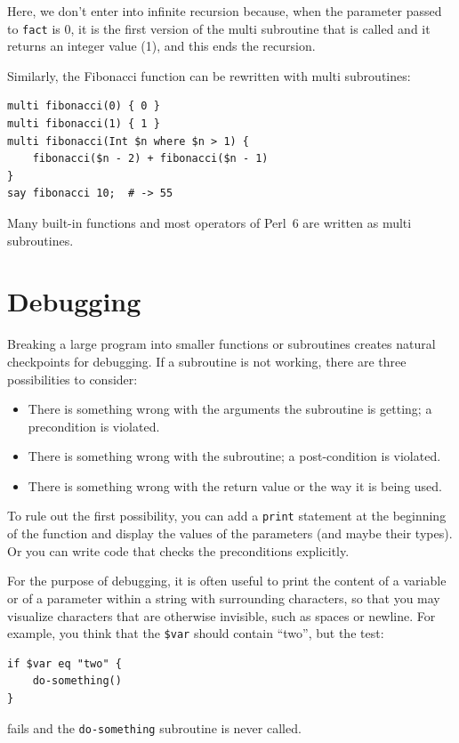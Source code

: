 Here, we don't enter into infinite recursion because, when 
the parameter passed to {\tt fact} is 0, it is the first 
version of the multi subroutine that is called and it returns 
an integer value (1), and this ends the recursion.

Similarly, the Fibonacci function can be rewritten with 
multi subroutines:

\begin{verbatim}
multi fibonacci(0) { 0 }
multi fibonacci(1) { 1 }
multi fibonacci(Int $n where $n > 1) { 
    fibonacci($n - 2) + fibonacci($n - 1) 
}
say fibonacci 10;  # -> 55
\end{verbatim}

Many built-in functions and most operators of Perl~6 are 
written as multi subroutines.

\section{Debugging}
\label{factdebug}

Breaking a large program into smaller functions or subroutines 
creates natural checkpoints for debugging.  If a subroutine 
is not working, there are three possibilities to consider:

\begin{itemize}

\item There is something wrong with the arguments the subroutine
is getting; a precondition is violated.

\item There is something wrong with the subroutine; a post-condition
is violated.

\item There is something wrong with the return value or the
way it is being used.

\end{itemize}

To rule out the first possibility, you can add a {\tt print} statement
at the beginning of the function and display the values of the
parameters (and maybe their types).  Or you can write code
that checks the preconditions explicitly.

For the purpose of debugging, it is often useful to print the content of a variable or of a parameter within a string with surrounding characters, so that you may visualize characters that are otherwise invisible, such as spaces or newline. For example, you think that the \verb'$var' should contain ``two'', but the test:
\begin{verbatim}
if $var eq "two" {
    do-something()
}
\end{verbatim}
%
fails and the {\tt do-something} subroutine is never called.

